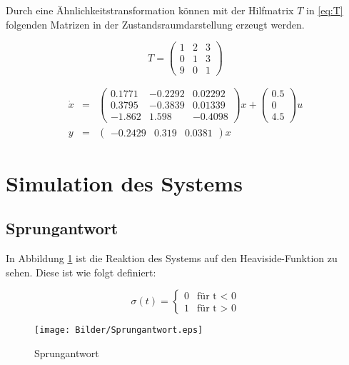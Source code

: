 Durch eine Ähnlichkeitstransformation können mit der Hilfmatrix $T$ in \ref{eq:T} folgenden Matrizen in der Zustandsraumdarstellung erzeugt werden.

\begin{equation*}
    \label{eq:T}
    T = \left(\begin{array}{ccc} 1 & 2 & 3\\ 0 & 1 & 3\\ 9 & 0 & 1 \end{array}\right)
\end{equation*} 

\begin{eqnarray*}
    \dot x &=& \left(\begin{array}{ccc} 0.1771 & -0.2292 & 0.02292\\ 0.3795 & -0.3839 & 0.01339\\ -1.862 & 1.598 & -0.4098 \end{array}\right)x + \left(\begin{array}{c} 0.5\\ 0\\ 4.5 \end{array}\right)u \\
    y &=& \left(\begin{array}{ccc} -0.2429 & 0.319 & 0.0381 \end{array}\right)x
\end{eqnarray*}



\section{Simulation des Systems}

\subsection{Sprungantwort}

In Abbildung \ref{fig:sprung} ist die Reaktion des Systems auf den Heaviside-Funktion zu sehen. Diese ist wie folgt definiert:

\[
\sigma (t) = \begin{cases} 0 & \text{für t < 0} \\ 1 & \text{für t > 0} \end{cases}  
\]

\begin{figure}[H]
    \label{fig:sprung}
    \centering
    \texttt{[image: Bilder/Sprungantwort.eps]}
    \caption{Sprungantwort}
 \end{figure}


